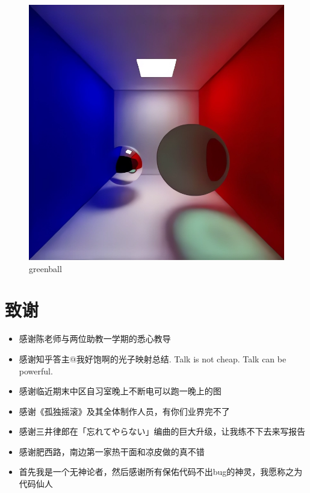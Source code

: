 \documentclass[12pt]{article}
\begin{document}
\begin{figure}[htbp]
    \centering
    \includegraphics[scale=0.6]{pic4.png}
    \caption{greenball}
\end{figure}


\newpage

\section*{致谢}
{\large
\begin{itemize}
    \item 感谢陈老师与两位助教一学期的悉心教导
    \item 感谢知乎答主@我好饱啊的光子映射总结. Talk is not cheap. Talk can be powerful.
    \item 感谢临近期末中区自习室晚上不断电可以跑一晚上的图
    \item 感谢《孤独摇滚》及其全体制作人员，有你们业界完不了
    \item 感谢三井律郎在「忘れてやらない」编曲的巨大升级，让我练不下去来写报告
    \item 感谢肥西路，南边第一家热干面和凉皮做的真不错
    \item 首先我是一个无神论者，然后感谢所有保佑代码不出bug的神灵，我愿称之为代码仙人
\end{itemize}
}
\end{document}
